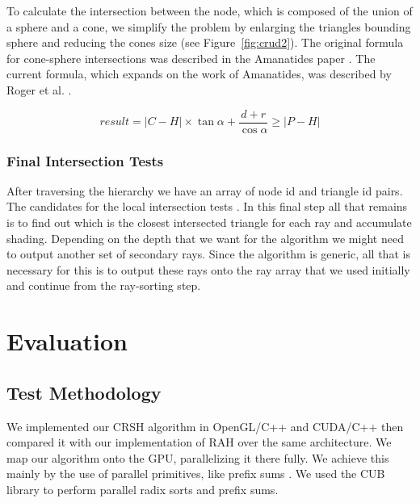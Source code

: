 \documentclass{egpubl}
\begin{document}
To calculate the intersection between the node, which is composed of the union of a sphere and a cone, we simplify the problem by enlarging the triangles bounding sphere \cite{Ericson04} and reducing the cones size (see Figure~\ref{fig:crud2}). The original formula for cone-sphere intersections was described in the Amanatides paper \cite{Amanatides84}. The current formula, which expands on the work of Amanatides, was described by Roger et al. \cite{Roger07}.

\begin{equation}
result = {|C - H|} \times \tan{\alpha} + \frac{d+r}{\cos{\alpha}} \geqslant
         {|P - H|}
\end{equation}

\subsubsection{Final Intersection Tests}

After traversing the hierarchy we have an array of node id and triangle id pairs. The candidates for the local intersection tests \cite{Moller97}. In this final step all that remains is to find out which is the closest intersected triangle for each ray and accumulate shading. Depending on the depth that we want for the algorithm we might need to output another set of secondary rays. Since the algorithm is generic, all that is necessary for this is to output these rays onto the ray array that we used initially and continue from the ray-sorting step.


\section{Evaluation}

\subsection{Test Methodology}

We implemented our CRSH algorithm in OpenGL/C++ and CUDA/C++ then compared it with our implementation of RAH \cite{Roger07} over the same architecture. We map our algorithm onto the GPU, parallelizing it there fully. We achieve this mainly by the use of parallel primitives, like prefix sums \cite{Blelloch90}. We used the CUB \cite{Merrill09}  \cite{Merrill11} library to perform parallel radix sorts and prefix sums.
\end{document}
